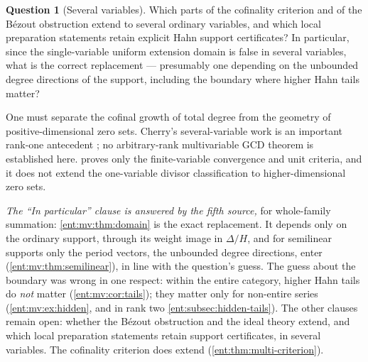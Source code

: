 \documentclass[11pt]{article}
\theoremstyle{plain}
\theoremstyle{plain}
\theoremstyle{plain}
\theoremstyle{definition}
\theoremstyle{definition}
\theoremstyle{definition}
\theoremstyle{definition}
\newtheorem{question}[question]{Question}
\theoremstyle{remark}
\begin{document}
\begin{question}[Several variables]\label{ent:q:several}
Which parts of the cofinality criterion and of the B\'ezout obstruction
extend to several ordinary variables, and which local preparation statements
retain explicit Hahn support certificates? In particular, since the
single-variable uniform extension domain is false in several variables, what
is the correct replacement --- presumably one depending on the unbounded
degree directions of the support, including the boundary where higher Hahn
tails matter?
\end{question}
One must separate the cofinal growth of total degree from the geometry of
positive-dimensional zero sets. Cherry's several-variable work is an
important rank-one antecedent \cite{Cherry}; no arbitrary-rank multivariable
GCD theorem is established here.
 proves only the finite-variable convergence and
unit criteria, and it does not extend the one-variable divisor
classification to higher-dimensional zero sets.

\emph{The ``In particular'' clause is answered by the fifth source,}
for whole-family summation: \cref{ent:mv:thm:domain} is the exact
replacement. It depends only on the ordinary support, through its weight
image in $\Delta/H$, and for semilinear supports only the period vectors,
the unbounded degree directions, enter (\cref{ent:mv:thm:semilinear}), in
line with the question's guess. The guess about the boundary was wrong in one
respect: within the entire category, higher Hahn tails do
\emph{not} matter (\cref{ent:mv:cor:tails}); they matter only for non-entire
series (\cref{ent:mv:ex:hidden}, and in rank two
\cref{ent:subsec:hidden-tails}). The other clauses remain open: whether the
B\'ezout obstruction and the ideal theory extend, and which local
preparation statements retain support certificates, in several variables.
The cofinality criterion does extend (\cref{ent:thm:multi-criterion}).
\end{document}
